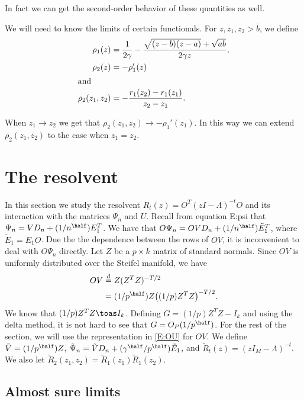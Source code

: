 In fact we can get the second-order behavior of these quantities as well.

\clearpage




We will need to know the limits of certain functionals.  For
$z, z_1, z_2 > \bar b$, we define
\begin{align*}
    \rho_1(z)
        &=
        \frac{1}{2 \gamma}
        -
        \frac{\sqrt{(z - b)(z - a)} + \sqrt{ a b}}
             {2 \gamma z}, \\
    \rho_2(z)
        &= -\rho_{1}'(z) \\
\intertext{and}
    \rho_2(z_1, z_2)
        &= - \frac{r_1(z_2) - r_1(z_1)}{z_2 - z_1}.
\end{align*}

\noindent
When $z_1 \to z_2$ we get that $\rho_2 (z_1, z_2) \to - \rho_1'(z_1)$.  In this way we can extend $\rho_2 (z_1, z_2)$ to the case when $z_1 = z_2$.

\section{The resolvent}\label{S:resolvent}

In this section we study the resolvent $R_t(z) = O^T (z I - \Lambda)^{-t} O$ 
and its interaction with the matrices $\Psi_n$ and $U$.  Recall from equation
{E:psi} that $\Psi_n = V D_n + (1/n^{\half}) E_1^T$.  We have that
$O \Psi_n = O V D_n + (1/n^{\half}) \tilde E_1^T$, where $\tilde E_1 = E_1 O$.
Due the the dependence between the rows of $O V$, it is inconvenient to
deal with $O \Psi_n$ directly.  Let $Z$ be a $p \times k$ matrix of \iid standard normals.  Since $O V$ is uniformly distributed over the Steifel manifold, we have
\begin{align}\label{E:OU}
    O V
        &\overset{d}{=} Z (Z^T Z)^{-T/2}  \notag \\
        &= (1/p^\half) Z \big((1/p) Z^T Z\big)^{-T/2}.  
\end{align}    
We know that
$(1/p) Z^T Z \toas I_k$.  Defining $G = (1/p) Z^T Z - I_k$ and using the
delta method, it is not hard to see that $G = O_P(1/p^\half)$.  For the rest
of the section, we will use the representation in \eqref{E:OU} for $OV$.  We
define $\tilde V = (1/p^\half) Z$,
$\tilde \Psi_n =  \tilde V D_n + (\gamma^{\half} / p^\half) \tilde E_1$,
and $\tilde R_t (z) = (z I_M - \Lambda)^{-t}$.  We also let 
$\tilde R_2(z_1, z_2) = \tilde R_1 (z_1) \tilde R_1 (z_2)$.


\subsection{Almost sure limits}

